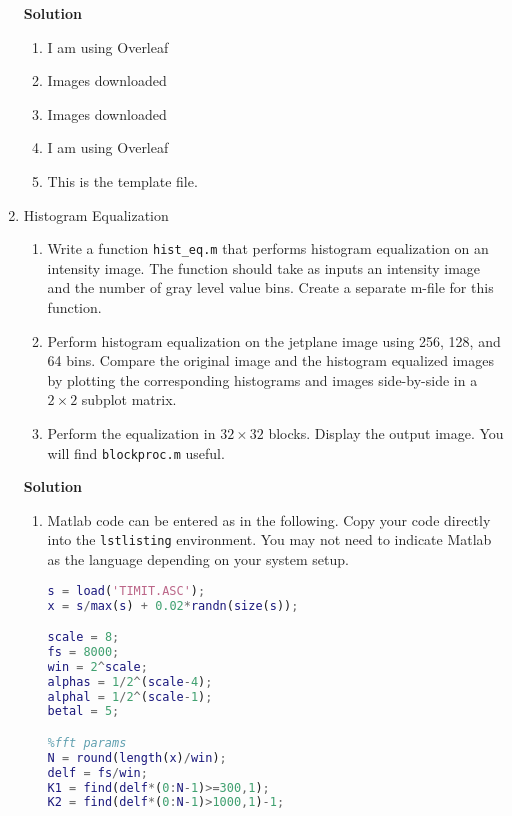 \documentclass[letterpaper,11pt]{article}
\begin{document}
\begin{enumerate}
\textbf{Solution}

\begin{enumerate}
\item I am using Overleaf
\item Images downloaded
\item Images downloaded
\item I am using Overleaf
\item This is the template file.
\end{enumerate}

\item Histogram Equalization

\begin{enumerate}
\item Write a function \texttt{hist\_eq.m} that performs histogram equalization on an intensity image.  The function should take as inputs an intensity image and the number of gray level value bins. Create a separate m-file for this function.  

\item Perform histogram equalization on the jetplane image using 256, 128, and 64 bins.  Compare the original image and the histogram equalized images by plotting the corresponding histograms and images side-by-side in a $2\times2$ subplot matrix.

\item Perform the equalization in $32\times32$ blocks.  Display the output image.  You will find \texttt{blockproc.m} useful. 

\end{enumerate}

\textbf{Solution}

\begin{enumerate}
\item Matlab code can be entered as in the following.  Copy your code directly into the \texttt{lstlisting} environment.  You may not need to indicate Matlab as the language depending on your system setup.

\begin{lstlisting}[language=Matlab]
% name_of_file_function.m
s = load('TIMIT.ASC');
x = s/max(s) + 0.02*randn(size(s));

scale = 8;
fs = 8000;
win = 2^scale;
alphas = 1/2^(scale-4);
alphal = 1/2^(scale-1);
betal = 5;

%fft params
N = round(length(x)/win);
delf = fs/win;
K1 = find(delf*(0:N-1)>=300,1);
K2 = find(delf*(0:N-1)>1000,1)-1;
\end{lstlisting}


\end{enumerate}
\end{enumerate}
\end{document}
